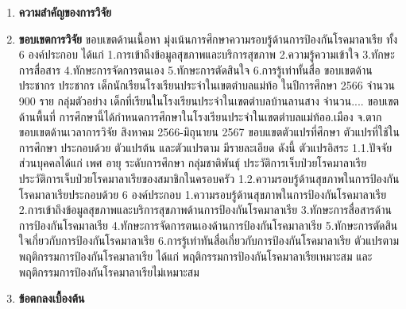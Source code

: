 \begin{titlepage}
\begin{enumerate}
    
    \lipsum[1-1]

    \item\textbf{ความสำคัญของการวิจัย}
    
    \lipsum[1-1]

    \item\textbf{ขอบเขตการวิจัย}
  ขอบเขตด้านเนื้อหา
    มุ่งเน้นการศึกษาความรอบรู้ด้านการป้องกันโรคมาลาเรีย ทั้ง 6 องค์ประกอบ ได้แก่ 1.การเข้าถึงข้อมูลสุขภาพและบริการสุขภาพ 2.ความรู้ความเข้าใจ 3.ทักษะการสื่อสาร 4.ทักษะการจัดการตนเอง 5.ทักษะการตัดสินใจ 6.การรู้เท่าทั้นสื่อ
  ขอบเขตด้านประชากร
    ประชากร เด็กนักเรียนโรงเรียนประจำในเขตตำบลแม่ท้อ ในปีการศึกษา 2566 จำนวน 900 ราย
    กลุ่มตัวอย่าง เด็กที่เรียนในโรงเรียนประจำในเขตตำบลบ้านลานสาง จำนวน....
  ขอบเขตด้านพื้นที่
    การศึกษานี้ได้กำหนดการศึกษาในโรงเรียนประจำในเขตตำบลแม่ท้ออ.เมือง จ.ตาก 
  ขอบเขตด้านเวลาการวิจัย
    สิงหาคม 2566-มิถุนายน 2567
  ขอบแขตตัวแปรที่ศึกษา
    ตัวแปรที่ใช้ในการศึกษา ประกอบด้วย ตัวแปรต้น และตัวแปรตาม มีรายละเอียด ดังนี้
    ตัวแปรอิสระ 
    1.1.ปัจจัยส่วนบุคคลได้แก่ เพศ อายุ ระดับการศึกษา กลุ่มชาติพันธุ์ ประวัติการเจ็บป่วยโรคมาลาเรีย ประวัติการเจ็บป่วยโรคมาลาเรียของสมาชิกในครอบครัว
    1.2.ความรอบรู้ด้านสุขภาพในการป้องกันโรคมาลาเรียประกอบด้วย 6 องค์ประกอบ 1.ความรอบรู้ด้านสุขภาพในการป้องกันโรคมาลาเรีย 2.การเข้าถึงข้อมูลสุขภาพและบริการสุขภาพด้านการป้องกันโรคมาลาเรีย 3.ทักษะการสื่อสารด้านการป้องกันโรคมาลเรีย 4.ทักษะการจัดการตนเองด้านการป้องกันโรคมาลาเรีย 5.ทักษะการตัดสินใจเกี่ยวกับการป้องกันโรคมาลาเรีย 6.การรู้เท่าทันสื่อเกี่ยวกับการป้องกันโรคมาลาเรีย
    ตัวแปรตาม
    พฤติกรรมการป้องกันโรคมาลาเรีย ได้แก่ พฤติกรรมการป้องกันโรคมาลาเรียเหมาะสม และพฤติกรรมการป้องกันโรคมาลาเรียไม่เหมาะสม

    \lipsum[1-1]

    \item\textbf{ข้อตกลงเบื้องต้น}
    
    \lipsum[1-1]


\end{enumerate}
\end{titlepage}
